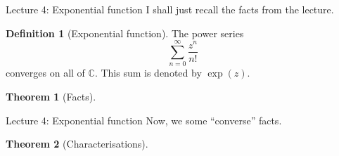 \documentclass[handout, dvipsnames]{beamer}
\theoremstyle{definition}
\newtheorem{defn}{Definition}
\newtheorem{thm}{Theorem}
\begin{document}
\begin{frame}{Lecture 4: Exponential function}
    I shall just recall the facts from the lecture.
    \begin{defn}[Exponential function]
        The power series
        \begin{equation*} 
            \sum_{n = 0}^{\infty}\dfrac{z^n}{n!}
        \end{equation*}
        converges on all of $\mathbb{C}.$ This sum is denoted by $\exp(z).$
    \end{defn}
    \begin{thm}[Facts]
        \begin{enumerate}
        \end{enumerate}
    \end{thm}
\end{frame}
\begin{frame}{Lecture 4: Exponential function}
    Now, we some ``converse'' facts.
    \begin{thm}[Characterisations]
        \begin{enumerate}
        \end{enumerate}
    \end{thm}
\end{frame}
\end{document}
